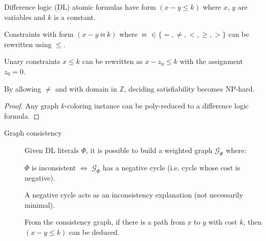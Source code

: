 Difference logic (DL) atomic formulas have form $(x - y \leq k)$
where $x$, $y$ are variables and $k$ is a constant.

\begin{remark}
    Constraints with form $(x - y \bowtie k)$
    where $\bowtie \,\in \{ =, \neq, <, \geq, > \}$ can be rewritten using $\leq$.
\end{remark}

\begin{remark}
    Unary constraints $x \leq k$ can be rewritten as $x - z_0 \leq k$
    with the assignment $z_0 = 0$.
\end{remark}

\begin{theorem}
    By allowing $\neq$ and with domain in $\mathbb{Z}$,
    deciding satisfiability becomes NP-hard.

    \begin{proof}
        Any graph $k$-coloring instance can be poly-reduced to a difference logic formula.
    \end{proof}
\end{theorem}

\begin{description}
    \item[Graph consistency] 
        Given DL literals $\Phi$, it is possible to build a weighted graph $\mathcal{G}_\Phi$ where:

        \begin{theorem}
            $\Phi$ is inconsistent $\iff$ $\mathcal{G}_\Phi$ has a negative cycle 
            (i.e. cycle whose cost is negative).
        \end{theorem}

        \begin{remark}
            A negative cycle acts as an inconsistency explanation (not necessarily minimal).
        \end{remark}

        \begin{remark}
            From the consistency graph, if there is a path from $x$ to $y$ with cost $k$,
            then $(x - y \leq k)$ can be deduced.
        \end{remark}
\end{description}



